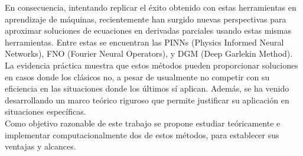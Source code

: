 \documentclass[a4paper,11pt]{scrartcl}
\begin{document}
En consecuencia, intentando replicar el éxito obtenido con estas herramientas en aprendizaje de máquinas, recientemente han surgido nuevas perspectivas para aproximar soluciones de ecuaciones en derivadas parciales usando estas mismas herramientas. Entre estas se encuentran las PINNs (Physics Informed Neural Networks), FNO (Fourier Neural Operators), y DGM (Deep Garlekin Method). La evidencia práctica muestra que estos métodos pueden proporcionar soluciones en casos donde los clásicos no, a pesar de usualmente no competir con su eficiencia en las situaciones donde los últimos sí aplican. Además, se ha venido desarrollando un marco teórico riguroso que permite justificar su aplicación en situaciones específicas.  \\

Como objetivo razonable de este trabajo se propone estudiar teóricamente e implementar computacionalmente dos de estos métodos, para establecer sus ventajas y alcances.\\
\end{document}
